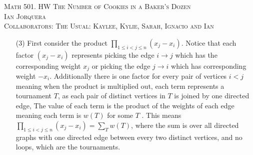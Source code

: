 \documentclass[12pt]{amsart}
\theoremstyle{definition}
\newcommand{\ra}{\rightarrow}
\begin{document}
\begin{center}
    \textsc{Math 501. HW The Number of Cookies in a Baker's Dozen\\ Ian Jorquera\\ Collaborators: The Usual: Kaylee, Kylie, Sarah, Ignacio and Ian }
\end{center}
\vspace{1em}

\begin{itemize}


\item[(3)] %
First consider the product $\displaystyle{\prod_{1\leq i < j \leq n}(x_j-x_i)}$. Notice that each factor $(x_j-x_i)$ represents picking the edge $i\ra j$ which has the corresponding weight $x_j$ or picking the edge $j\ra i$ which has corresponding weight $-x_i$. Additionally there is one factor for every pair of vertices $i<j$ meaning when the product is multiplied out, each term represents a tournament $T$, as each pair of distinct vertices in $T$ is joined by one directed edge, The value of each term is the product of the weights of each edge meaning each term is $w(T)$ for some $T$ . This means $\displaystyle{\prod_{1\leq i < j \leq n}(x_j-x_i)=\sum_{T}w(T)}$, where the sum is over all directed graphs with one directed edge between every two distinct vertices, and no loops, which are the tournaments.\\

\end{itemize}
\end{document}
